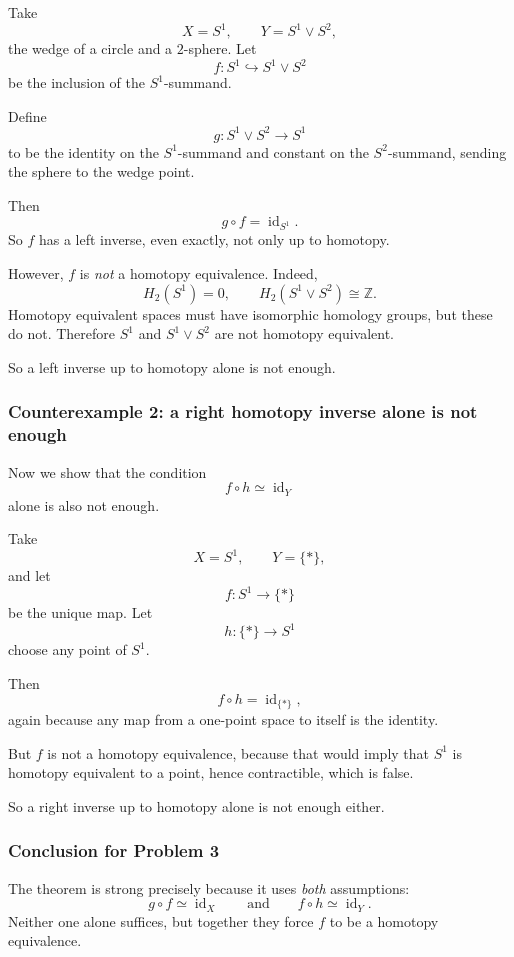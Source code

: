 \documentclass[12pt,a4paper]{article}
\theoremstyle{notespace}
\begin{document}
Take
\[
X=S^1,
\qquad
Y=S^1\vee S^2,
\]
the wedge of a circle and a \(2\)-sphere. Let
\[
f:S^1\hookrightarrow S^1\vee S^2
\]
be the inclusion of the \(S^1\)-summand.

Define
\[
g:S^1\vee S^2\to S^1
\]
to be the identity on the \(S^1\)-summand and constant on the \(S^2\)-summand, sending the sphere to the wedge point.

Then
\[
g\circ f=\operatorname{id}_{S^1}.
\]
So \(f\) has a left inverse, even exactly, not only up to homotopy.

However, \(f\) is \emph{not} a homotopy equivalence. Indeed,
\[
H_2(S^1)=0,
\qquad
H_2(S^1\vee S^2)\cong \mathbb{Z}.
\]
Homotopy equivalent spaces must have isomorphic homology groups, but these do not. Therefore \(S^1\) and \(S^1\vee S^2\) are not homotopy equivalent.

So a left inverse up to homotopy alone is not enough.

\subsubsection{Counterexample 2: a right homotopy inverse alone is not enough}

Now we show that the condition
\[
f\circ h \simeq \operatorname{id}_Y
\]
alone is also not enough.

Take
\[
X=S^1,
\qquad
Y=\{*\},
\]
and let
\[
f:S^1\to \{*\}
\]
be the unique map. Let
\[
h:\{*\}\to S^1
\]
choose any point of \(S^1\).

Then
\[
f\circ h=\operatorname{id}_{\{*\}},
\]
again because any map from a one-point space to itself is the identity.

But \(f\) is not a homotopy equivalence, because that would imply that \(S^1\) is homotopy equivalent to a point, hence contractible, which is false.

So a right inverse up to homotopy alone is not enough either.

\subsubsection{Conclusion for Problem 3}

The theorem is strong precisely because it uses \emph{both} assumptions:
\[
g\circ f \simeq \operatorname{id}_X
\qquad\text{and}\qquad
f\circ h \simeq \operatorname{id}_Y.
\]
Neither one alone suffices, but together they force \(f\) to be a homotopy equivalence.

\bigskip
\end{document}
